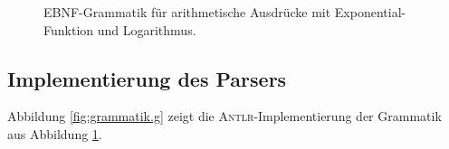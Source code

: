 \begin{figure}[htbp]
  \begin{center}    
  \end{center}
  \caption{EBNF-Grammatik f\"ur arithmetische Ausdr\"ucke mit Exponential-Funktion und Logarithmus.}
  \label{fig:Expr-exp-ln}
\end{figure}

\subsection{Implementierung des Parsers}
Abbildung \ref{fig:grammatik.g} zeigt die \textsc{Antlr}-Implementierung der Grammatik
aus Abbildung \ref{fig:Expr-exp-ln}.  

